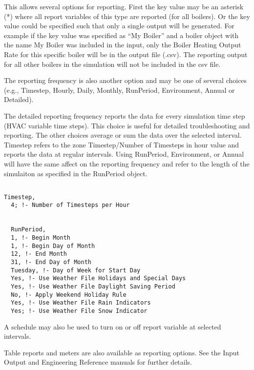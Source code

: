 This allows several options for reporting. First the key value may be an asterisk (*) where all report variables of this type are reported (for all boilers). Or the key value could be specified such that only a single output will be generated. For example if the key value was specified as ``My Boiler'' and a boiler object with the name My Boiler was included in the input, only the Boiler Heating Output Rate for this specific boiler will be in the output file (.csv). The reporting output for all other boilers in the simulation will not be included in the csv file.

The reporting frequency is also another option and may be one of several choices (e.g., Timestep, Hourly, Daily, Monthly, RunPeriod, Environment, Annual or Detailed).

The detailed reporting frequency reports the data for every simulation time step (HVAC variable time steps). This choice is useful for detailed troubleshooting and reporting. The other choices average or sum the data over the selected interval. Timestep refers to the zone Timestep/Number of Timesteps in hour value and reports the data at regular intervals. Using RunPeriod, Environment, or Annual will have the same affect on the reporting frequency and refer to the length of the simulaiton as specified in the RunPeriod object.

\begin{lstlisting}

Timestep,
  4; !- Number of Timesteps per Hour


  RunPeriod,
  1, !- Begin Month
  1, !- Begin Day of Month
  12, !- End Month
  31, !- End Day of Month
  Tuesday, !- Day of Week for Start Day
  Yes, !- Use Weather File Holidays and Special Days
  Yes, !- Use Weather File Daylight Saving Period
  No, !- Apply Weekend Holiday Rule
  Yes, !- Use Weather File Rain Indicators
  Yes; !- Use Weather File Snow Indicator
\end{lstlisting}

A schedule may also be used to turn on or off report variable at selected intervals.

Table reports and meters are also available as reporting options. See the Input Output and Engineering Reference manuals for further details.

